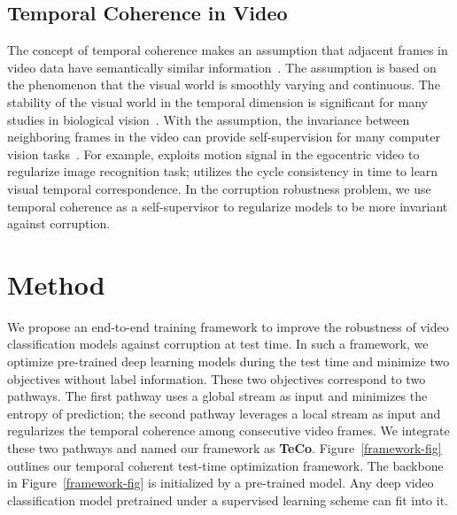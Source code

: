 \documentclass{article} %
\begin{document}
\subsection{Temporal Coherence in Video}
The concept of temporal coherence makes an assumption that adjacent frames in video data have semantically similar information~\citep{goroshin2015unsupervised}. 
The assumption is based on the phenomenon that the visual world is smoothly varying and continuous. 
The stability of the visual world in the temporal dimension is significant for many studies in biological vision~\citep{li2008unsupervised,wood2016smoothness,wood2016development}. 
With the assumption, the invariance between neighboring frames in the video can provide self-supervision for many computer vision tasks~\citep{jayaraman2015learning,wiskott2002slow,Dwibedi_2019_CVPR,wang2019learning}. 
For example,  \cite{jayaraman2015learning} exploits motion signal in the egocentric video to regularize image recognition task; \cite{wang2019learning} utilizes the cycle consistency in time to learn visual temporal correspondence. 
In the corruption robustness problem, we use temporal coherence as a self-supervisor to regularize models to be more invariant against corruption.

\section{Method}
We propose an end-to-end training framework to improve the robustness of video classification models against corruption at test time. 
In such a framework, we optimize pre-trained deep learning models during the test time and minimize two objectives without label information. 
These two objectives correspond to two pathways. 
The first pathway uses a global stream as input and minimizes the entropy of prediction; the second pathway leverages a local stream as input and regularizes the temporal coherence among consecutive video frames. 
We integrate these two pathways and named our framework as \textbf{TeCo}.
Figure~\ref{framework-fig} outlines our temporal coherent test-time optimization framework.
The backbone in Figure~\ref{framework-fig} is initialized by a pre-trained model. Any deep video classification model pretrained under a supervised learning scheme can fit into it.  
\end{document}
